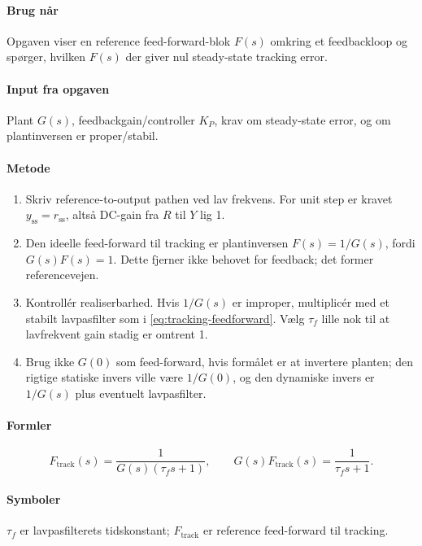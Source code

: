 \paragraph{Brug når}
Opgaven viser en reference feed-forward-blok \(F(s)\) omkring et feedbackloop og spørger,
hvilken \(F(s)\) der giver nul steady-state tracking error.

\paragraph{Input fra opgaven}
Plant \(G(s)\), feedbackgain/controller \(K_P\), krav om steady-state error, og om
plantinversen er proper/stabil.

\paragraph{Metode}
\begin{enumerate}
\item Skriv reference-to-output pathen ved lav frekvens. For unit step er kravet
      \(y_{\mathrm{ss}}=r_{\mathrm{ss}}\), altså DC-gain fra \(R\) til \(Y\) lig 1.
\item Den ideelle feed-forward til tracking er plantinversen \(F(s)=1/G(s)\), fordi
      \(G(s)F(s)=1\). Dette fjerner ikke behovet for feedback; det former referencevejen.
\item Kontrollér realiserbarhed. Hvis \(1/G(s)\) er improper, multiplicér med et stabilt
      lavpasfilter som i \eqref{eq:tracking-feedforward}. Vælg \(\tau_f\) lille nok til
      at lavfrekvent gain stadig er omtrent 1.
\item Brug ikke \(G(0)\) som feed-forward, hvis formålet er at invertere planten; den
      rigtige statiske invers ville være \(1/G(0)\), og den dynamiske invers er
      \(1/G(s)\) plus eventuelt lavpasfilter.
\end{enumerate}

\paragraph{Formler}
\begin{equation}
\label{eq:tracking-feedforward}
F_{\mathrm{track}}(s)=\frac{1}{G(s)(\tau_f s+1)},\qquad
G(s)F_{\mathrm{track}}(s)=\frac{1}{\tau_f s+1}.
\end{equation}

\paragraph{Symboler}
\(\tau_f\) er lavpasfilterets tidskonstant; \(F_{\mathrm{track}}\) er reference
feed-forward til tracking.

